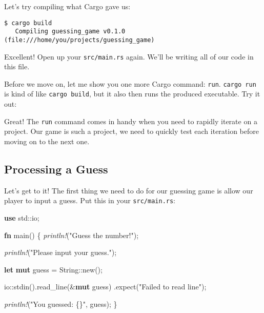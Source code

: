 \documentclass[a4paper,]{book}
\newenvironment{Shaded}{\begin{snugshade}}{\end{snugshade}}
\newcommand{\KeywordTok}[1]{\textcolor[rgb]{0.13,0.29,0.53}{\textbf{{#1}}}}
\newcommand{\DataTypeTok}[1]{\textcolor[rgb]{0.13,0.29,0.53}{{#1}}}
\newcommand{\StringTok}[1]{\textcolor[rgb]{0.31,0.60,0.02}{{#1}}}
\newcommand{\PreprocessorTok}[1]{\textcolor[rgb]{0.56,0.35,0.01}{\textit{{#1}}}}
\newcommand{\NormalTok}[1]{{#1}}
\begin{document}
Let's try compiling what Cargo gave us:

\begin{verbatim}
$ cargo build
   Compiling guessing_game v0.1.0 (file:///home/you/projects/guessing_game)
\end{verbatim}

Excellent! Open up your \texttt{src/main.rs} again. We'll be writing all
of our code in this file.

Before we move on, let me show you one more Cargo command: \texttt{run}.
\texttt{cargo\ run} is kind of like \texttt{cargo\ build}, but it also
then runs the produced executable. Try it out:

\begin{Shaded}
\end{Shaded}

Great! The \texttt{run} command comes in handy when you need to rapidly
iterate on a project. Our game is such a project, we need to quickly
test each iteration before moving on to the next one.

\subsection{Processing a Guess}\label{processing-a-guess}

Let's get to it! The first thing we need to do for our guessing game is
allow our player to input a guess. Put this in your
\texttt{src/main.rs}:

\begin{Shaded}
\begin{Highlighting}[]
\KeywordTok{use} \NormalTok{std::io;}

\KeywordTok{fn} \NormalTok{main() \{}
    \PreprocessorTok{println!}\NormalTok{(}\StringTok{"Guess the number!"}\NormalTok{);}

    \PreprocessorTok{println!}\NormalTok{(}\StringTok{"Please input your guess."}\NormalTok{);}

    \KeywordTok{let} \KeywordTok{mut} \NormalTok{guess = }\DataTypeTok{String}\NormalTok{::new();}

    \NormalTok{io::stdin().read_line(&}\KeywordTok{mut} \NormalTok{guess)}
        \NormalTok{.expect(}\StringTok{"Failed to read line"}\NormalTok{);}

    \PreprocessorTok{println!}\NormalTok{(}\StringTok{"You guessed: \{\}"}\NormalTok{, guess);}
\NormalTok{\}}
\end{Highlighting}
\end{Shaded}
\end{document}
